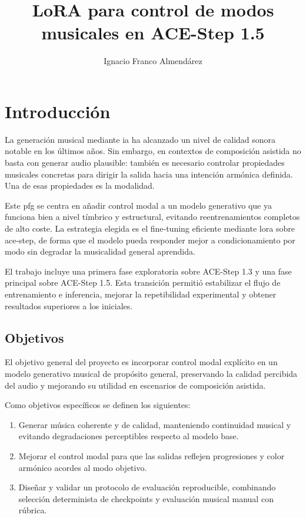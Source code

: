 \documentclass[%
    school=etsisi,%
    type=pfg,%
    degree=61CD,%
]{upm-report}
\title{LoRA para control de modos musicales en ACE-Step 1.5}
\author{Ignacio Franco Almend\'arez}
\begin{document}
\chapter{Introducci\'on}
\label{ch:introduccion}

La generaci\'on musical mediante \gls{ia} ha alcanzado un nivel de calidad sonora notable en los \'ultimos a\~nos. Sin embargo, en contextos de composici\'on asistida no basta con generar audio plausible: tambi\'en es necesario controlar propiedades musicales concretas para dirigir la salida hacia una intenci\'on arm\'onica definida. Una de esas propiedades es la modalidad.

Este \gls{pfg} se centra en a\~nadir control modal a un modelo generativo que ya funciona bien a nivel t\'imbrico y estructural, evitando reentrenamientos completos de alto coste. La estrategia elegida es el fine-tuning eficiente mediante \gls{lora} sobre \gls{ace-step}, de forma que el modelo pueda responder mejor a condicionamiento por modo sin degradar la musicalidad general aprendida.

El trabajo incluye una primera fase exploratoria sobre ACE-Step 1.3 y una fase principal sobre ACE-Step 1.5. Esta transici\'on permiti\'o estabilizar el flujo de entrenamiento e inferencia, mejorar la repetibilidad experimental y obtener resultados superiores a los iniciales.

\section{Objetivos}

El objetivo general del proyecto es incorporar control modal expl\'icito en un modelo generativo musical de prop\'osito general, preservando la calidad percibida del audio y mejorando su utilidad en escenarios de composici\'on asistida.

Como objetivos espec\'ificos se definen los siguientes:

\begin{enumerate}
    \item Generar m\'usica coherente y de calidad, manteniendo continuidad musical y evitando degradaciones perceptibles respecto al modelo base.
    \item Mejorar el control modal para que las salidas reflejen progresiones y color arm\'onico acordes al modo objetivo.
    \item Dise\~nar y validar un protocolo de evaluaci\'on reproducible, combinando selecci\'on determinista de checkpoints y evaluaci\'on musical manual con r\'ubrica.
\end{enumerate}
\end{document}
